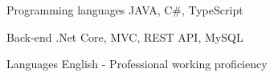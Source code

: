 

\begin{cvskills}

  \cvskill
    {Programming languages} %
    {JAVA, C\#, TypeScript} %

  \cvskill
    {Back-end} %
    {.Net Core, MVC, REST API, MySQL} %


  \cvskill
    {Languages} %
    {English - Professional working proficiency} %

\end{cvskills}
